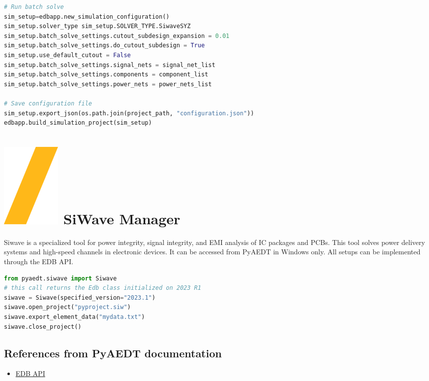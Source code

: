 \documentclass[landscape]{article}
\begin{document}
\begin{multicols}{3}
\begin{lstlisting}[language=Python]
# Run batch solve
sim_setup=edbapp.new_simulation_configuration()
sim_setup.solver_type sim_setup.SOLVER_TYPE.SiwaveSYZ
sim_setup.batch_solve_settings.cutout_subdesign_expansion = 0.01
sim_setup.batch_solve_settings.do_cutout_subdesign = True
sim_setup.use_default_cutout = False
sim_setup.batch_solve_settings.signal_nets = signal_net_list
sim_setup.batch_solve_settings.components = component_list
sim_setup.batch_solve_settings.power_nets = power_nets_list

# Save configuration file
sim_setup.export_json(os.path.join(project_path, "configuration.json"))
edbapp.build_simulation_project(sim_setup)
\end{lstlisting}
\section{\includegraphics[height=\fontcharht\font`\S]{slash.png} SiWave Manager}
Siwave is a specialized tool for power integrity, signal integrity, and EMI analysis of IC packages and PCBs. This tool solves power delivery systems and high-speed channels in electronic devices. It can be accessed from PyAEDT in Windows only. All setups can be implemented through the EDB API.
\begin{lstlisting}[language=Python]
from pyaedt.siwave import Siwave
# this call returns the Edb class initialized on 2023 R1
siwave = Siwave(specified_version="2023.1")
siwave.open_project("pyproject.siw")
siwave.export_element_data("mydata.txt")
siwave.close_project()
\end{lstlisting}


\subsection{References from PyAEDT documentation}
\begin{itemize}
\item \href{https://aedt.docs.pyansys.com/version/stable/EDBAPI/index.html}{EDB API}
\end{itemize}
\end{multicols}
\vspace{-0.15cm}
\end{document}
